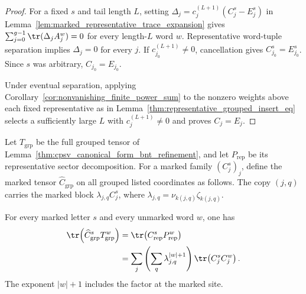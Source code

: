 \begin{proof}
    \leanok
    For a fixed $s$ and tail length $L$, setting
    $\Delta_j=c_j^{(L+1)}(C_j^s-E_j^s)$ in
    Lemma~\ref{lem:marked_representative_trace_expansion} gives
    $\sum_{j=0}^{g-1}\tr(\Delta_jA_j^w)=0$ for every length-$L$ word $w$.
    Representative word-tuple separation implies $\Delta_j=0$ for every
    $j$. If $c_{j_0}^{(L+1)}\neq0$, cancellation gives
    $C_{j_0}^s=E_{j_0}^s$. Since $s$ was arbitrary,
    $C_{j_0}=E_{j_0}$.

    Under eventual separation, applying
    Corollary~\ref{cor:nonvanishing_finite_power_sum} to the nonzero weights
    above each fixed representative as in
    Lemma~\ref{thm:representative_grouped_insert_eq} selects a
    sufficiently large $L$ with $c_j^{(L+1)}\neq0$ and proves $C_j=E_j$.
\end{proof}

\begin{lemma}
    \label{thm:cpsv_full_coordinate_marked_trace_identity}
    \leanok
    Let $T_{\mathrm{grp}}$ be the full grouped tensor of
    Lemma~\ref{thm:cpsv_canonical_form_bnt_refinement}, and let
    $P_{\mathrm{rep}}$ be its representative sector decomposition.
    For a marked family $(C_j^s)_j$, define the marked tensor
    $\widehat C_{\mathrm{grp}}$ on all grouped listed coordinates as follows.
    The copy $(j,q)$ carries the marked block
    $\lambda_{j,q}C_j^s$, where
    $\lambda_{j,q}=\nu_{k(j,q)}\zeta_{k(j,q)}$.

    For every marked letter $s$ and every unmarked word $w$, one has
    \begin{align}
        \tr\!\left(\widehat C_{\mathrm{grp}}^sT_{\mathrm{grp}}^w\right)
         & =\tr\!\left(C_{\mathrm{rep}}^sP_{\mathrm{rep}}^w\right)
        \notag                                                     \\
         & =\sum_j\left(\sum_q\lambda_{j,q}^{|w|+1}\right)
        \tr\!\left(C_j^sC_j^w\right).
        \label{eq:cpsv_full_coordinate_marked_trace_identity}
    \end{align}
    The exponent $|w|+1$ includes the factor at the marked site.
\end{lemma}

